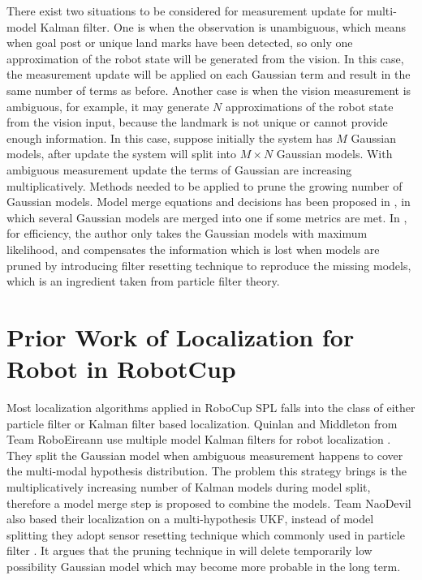 There exist two situations to be considered for measurement update for multi-model Kalman filter. One is when the observation is unambiguous, which means when goal post or unique land marks have been detected, so only one approximation of the robot state will be generated from the vision. In this case, the measurement update will be applied on each Gaussian term and result in the same number of terms as before. Another case is when the vision measurement is ambiguous, for example, it may generate $N$ approximations of the robot state from the vision input, because the landmark is not unique or cannot provide enough information. In this case, suppose initially the system has $M$ Gaussian models, after update the system will split into $M \times N$ Gaussian models. With ambiguous measurement update the terms of Gaussian are increasing multiplicatively. Methods needed to be applied to prune the growing number of Gaussian models. Model merge equations and decisions has been proposed in \cite{Quinlan2010}, in which several Gaussian models are merged into one if some metrics are met. In \cite{Jochmann2012}, for efficiency, the author only takes the Gaussian models with maximum likelihood, and compensates the information which is lost when models are pruned by introducing filter resetting technique to reproduce the missing models, which is an ingredient taken from particle filter theory.

\section{Prior Work of Localization for Robot in RobotCup}\label{sec:2.2}
Most localization algorithms applied in RoboCup \gls{SPL} falls into the class of either particle filter or Kalman filter based localization. Quinlan and Middleton from Team RoboEireann use multiple model Kalman filters for robot localization \cite{Quinlan2010}. They split the Gaussian model when ambiguous measurement happens to cover the multi-modal hypothesis distribution. The problem this strategy brings is the multiplicatively increasing number of Kalman models during model split, therefore a model merge step is proposed to combine the models. Team NaoDevil also based their localization on a multi-hypothesis \gls{UKF}, instead of model splitting they adopt sensor resetting technique which commonly used in particle filter \cite{Jochmann2012}. It argues that the  pruning technique in \cite{Quinlan2010} will delete temporarily low possibility Gaussian model which may become more probable in the long term.

